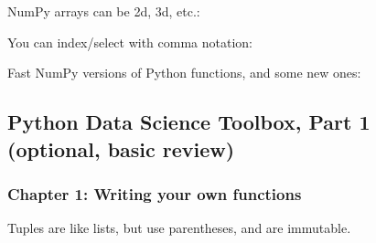 \documentclass[letterpaper,10pt,english]{sphinxmanual}
\begin{document}
NumPy arrays can be 2d, 3d, etc.:

\begin{sphinxVerbatim}[commandchars=\\\{\}]
   \PYG{p}{[} \PYG{p}{[}     \PYG{p}{]}
                \PYG{p}{[}     \PYG{p}{]} \PYG{p}{]} 
     
\end{sphinxVerbatim}

You can index/select with comma notation:

\begin{sphinxVerbatim}[commandchars=\\\{\}]
\PYG{p}{[}\PYG{p}{]}      
\PYG{p}{[}\PYG{p}{]}  
\PYG{p}{[}\PYG{p}{]}      
\PYG{p}{[}\PYG{p}{]}      
\end{sphinxVerbatim}

Fast NumPy versions of Python functions, and some new ones:

\begin{sphinxVerbatim}[commandchars=\\\{\}]
  
  
  
  
  
\end{sphinxVerbatim}


\subsection{Python Data Science Toolbox, Part 1 (optional, basic review)}
\label{\detokenize{big-cheat-sheet:python-data-science-toolbox-part-1-optional-basic-review}}

\subsubsection{Chapter 1: Writing your own functions}
\label{\detokenize{big-cheat-sheet:chapter-1-writing-your-own-functions}}
Tuples are like lists, but use parentheses, and are immutable.
\end{document}
